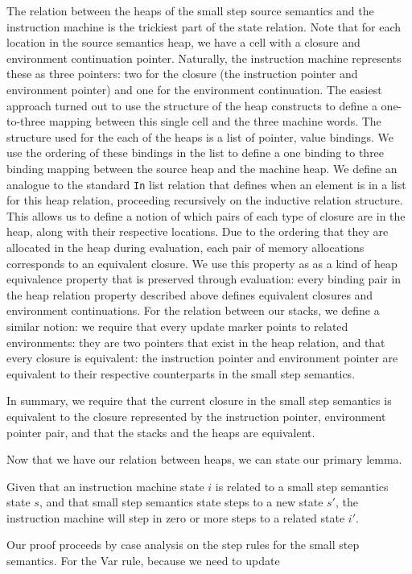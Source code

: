 The relation between the heaps of the small step source semantics and the
instruction machine is the trickiest part of the state relation. Note that for
each location in the source semantics heap, we have a cell with a closure and
environment continuation pointer. Naturally, the instruction machine represents
these as three pointers: two for the closure (the instruction pointer and
environment pointer) and one for the environment continuation. The easiest
approach turned out to use the structure of the heap constructs to define a
one-to-three mapping between this single cell and the three machine words. The
structure used for the each of the heaps is a list of pointer, value bindings.
We use the ordering of these bindings in the list to define a one binding to
three binding mapping between the source heap and the machine heap. We define an
analogue to the standard \texttt{In} list relation that defines when an element
is in a list for this heap relation, proceeding recursively on the inductive
relation structure. This allows us to define a notion of which pairs of each
type of closure are in the heap, along with their respective locations. Due to
the ordering that they are allocated in the heap during evaluation, each pair of
memory allocations corresponds to an equivalent closure. We use this property as
as a kind of heap equivalence property that is preserved through evaluation:
every binding pair in the heap relation property described above defines
equivalent closures and environment continuations. For the relation between our
stacks, we define a similar notion: we require that every update marker points
to related environments: they are two pointers that exist in the heap relation,
and that every closure is equivalent: the instruction pointer and environment
pointer are equivalent to their respective counterparts in the small step
semantics. 

In summary, we require that the current closure in the small step semantics is
equivalent to the closure represented by the instruction pointer, environment
pointer pair, and that the stacks and the heaps are equivalent.  

Now that we have our relation between heaps, we can state our primary lemma.
\begin{lemma}
Given that an instruction machine state $i$ is related to a small step
semantics state $s$, and that small step semantics state steps to a new state
$s'$, the instruction machine will step in zero or more steps to a related state
$i'$.
\end{lemma}
\begin{proofoutline}
Our proof proceeds by case analysis on the step rules for the small step
semantics. For the Var rule, because we need to update  
\end{proofoutline}
